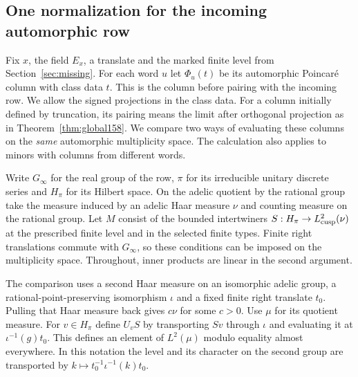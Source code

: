 \documentclass[a4paper,11pt]{article}
\theoremstyle{definition}
\theoremstyle{remark}
\numberwithin{equation}{section}
\begin{document}
\subsection{One normalization for the incoming automorphic row}
\label{sec:commonphase441}

Fix \(x\), the field \(E_x\), a translate and the marked finite level
from Section~\ref{sec:missing}. For each word \(u\) let \(\Phi_u(t)\)
be its automorphic Poincar\'e column with class data \(t\). This is the
column before pairing with the incoming row. We allow the signed
projections in the class data. For a column initially defined by
truncation, its pairing means the limit after orthogonal projection
as in Theorem~\ref{thm:global158}. We compare two ways of evaluating
these columns on the \emph{same} automorphic multiplicity space.
The calculation also applies to minors with columns from different
words.

Write \(G_\infty\) for the real group of the row, \(\pi\) for its
irreducible unitary discrete series and \(H_\pi\) for its Hilbert
space. On the adelic quotient by the rational group take the measure
induced by an adelic Haar measure \(\nu\) and counting measure on the
rational group. Let \(M\) consist of the bounded intertwiners
\(S:H_\pi\to L^2_{\rm cusp}(\nu)\) at the prescribed finite level
and in the selected finite types. Finite right translations commute
with \(G_\infty\), so these conditions can be imposed on the
multiplicity space. Throughout, inner products are linear in the
second argument.

The comparison uses a second Haar measure on an isomorphic adelic
group, a rational-point-preserving isomorphism \(\iota\) and a fixed
finite right translate \(t_0\). Pulling that Haar measure back gives
\(c\nu\) for some \(c>0\). Use \(\mu\) for its quotient measure.
For \(v\in H_\pi\) define \(U_vS\) by transporting \(Sv\) through
\(\iota\) and evaluating it at \(\iota^{-1}(g)t_0\). This defines
an element of \(L^2(\mu)\) modulo equality almost everywhere. In
this notation the level and its character on the second group
are transported by \(k\mapsto t_0^{-1}\iota^{-1}(k)t_0\).
\end{document}
